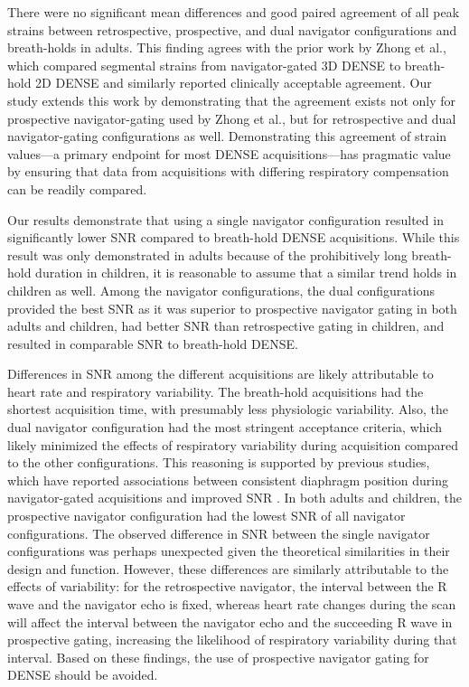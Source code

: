 	There were no significant mean differences and good paired agreement of all peak strains between retrospective, prospective, and dual navigator configurations and breath-holds in adults. This finding agrees with the prior work by Zhong et al., which compared segmental strains from navigator-gated 3D DENSE to breath-hold 2D DENSE \cite{Zhong2010a} and similarly reported clinically acceptable agreement. Our study extends this work by demonstrating that the agreement exists not only for prospective navigator-gating used by Zhong et al., but for retrospective and dual navigator-gating configurations as well. Demonstrating this agreement of strain values—a primary endpoint for most DENSE acquisitions—has pragmatic value by ensuring that data from acquisitions with differing respiratory compensation can be readily compared.
	
	Our results demonstrate that using a single navigator configuration resulted in significantly lower SNR compared to breath-hold DENSE acquisitions. While this result was only demonstrated in adults because of the prohibitively long breath-hold duration in children, it is reasonable to assume that a similar trend holds in children as well. Among the navigator configurations, the dual configurations provided the best SNR as it was superior to prospective navigator gating in both adults and children, had better SNR than retrospective gating in children, and resulted in comparable SNR to breath-hold DENSE.
	
	Differences in SNR among the different acquisitions are likely attributable to heart rate and respiratory variability. The breath-hold acquisitions had the shortest acquisition time, with presumably less physiologic variability. Also, the dual navigator configuration had the most stringent acceptance criteria, which likely minimized the effects of respiratory variability during acquisition compared to the other configurations. This reasoning is supported by previous studies, which have reported associations between consistent diaphragm position during navigator-gated acquisitions and improved SNR \cite{Feuerlein2009,Jhooti2011}. In both adults and children, the prospective navigator configuration had the lowest SNR of all navigator configurations. The observed difference in SNR between the single navigator configurations was perhaps unexpected given the theoretical similarities in their design and function. However, these differences are similarly attributable to the effects of variability: for the retrospective navigator, the interval between the R wave and the navigator echo is fixed, whereas heart rate changes during the scan will affect the interval between the navigator echo and the succeeding R wave in prospective gating, increasing the likelihood of respiratory variability during that interval. Based on these findings, the use of prospective navigator gating for DENSE should be avoided.
	
